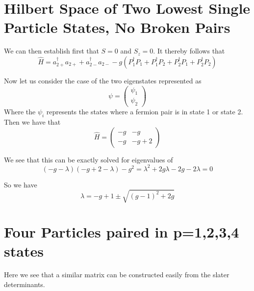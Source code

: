 \documentclass[11pt]{article} %
\begin{document}
\section{Hilbert Space of Two Lowest Single Particle States, No Broken Pairs}

We can then establish first that $S=0$ and $S_z=0$. It thereby follows that \\

\begin{equation}
\hat{H}=a_{2+}^\dagger a_{2+}+a_{2-}^\dagger a_{2-}-g\left(P_1^\dagger P_1+P_1^\dagger P_2+P_2^\dagger P_1 + P_2^\dagger P_2 \right)\end{equation}

Now let us consider the case of the two eigenstates represented as \begin{equation}\psi=\begin{pmatrix} \psi_1 \\ \psi_2 \end{pmatrix}\end{equation}
Where the $\psi_i$ represents the states where a fermion pair is in state 1 or state 2. Then we have that\\

\begin{equation}
\hat{H}=\begin{pmatrix}  -g & -g \\ -g & -g+2 \end{pmatrix}\end{equation}

We see that this can be exactly solved for eigenvalues of\\

\begin{equation}
\left(-g-\lambda\right)\left(-g+2-\lambda\right)-g^2=\lambda^2+2g\lambda-2g-2\lambda=0 \end{equation}

So we have\\

\begin{equation}
\lambda=-g+1 \pm \sqrt{(g-1)^2+2g} \end{equation}

\section{Four Particles paired in p=1,2,3,4 states}

Here we see that a similar matrix can be constructed easily from the slater determinants.\\
\end{document}
